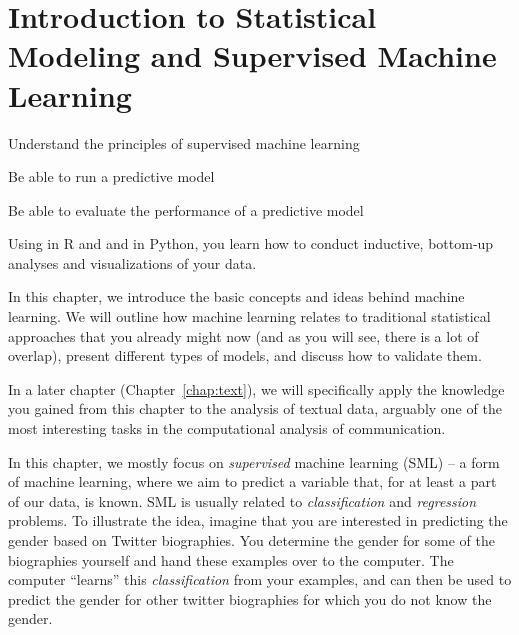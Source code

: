 \chapter{Introduction to Statistical Modeling and Supervised Machine Learning}
\label{chap:introsml}

\begin{abstract}{Abstract} This chapter introduces the reader to the world of supervised machine learning. It starts by outlining how classical statistical techniques such as regression models can be used for prediction. It then provides an overview of frequently-used techniques from Na\"ive Bayes classifiers to neural networks.
\end{abstract}



\begin{objectives}
\item Understand the principles of supervised machine learning
\item Be able to run a predictive model
\item Be able to evaluate the performance of a predictive model
\end{objectives}

\begin{feature}
Using  in R and  and  in Python, you learn how to conduct inductive, bottom-up analyses and visualizations of your data.
\end{feature}





In this chapter, we introduce the basic concepts and ideas behind
machine learning.  We will outline how machine learning relates to
traditional statistical approaches that you already might now (and as
you will see, there is a lot of overlap), present different types of
models, and discuss how to validate them.

In a later chapter (Chapter~\ref{chap:text}), we will 
specifically apply the knowledge you gained from this chapter to the
analysis of textual data, arguably one of the most interesting tasks
in the computational analysis of communication.

In this chapter, we mostly focus on \emph{supervised} machine learning (SML) 
-- a form of machine learning, where we aim to predict a variable
that, for at least a part of our data, is known. SML is usually related to \textit{classification} and \textit{regression}  problems. To illustrate the
idea, imagine that you are interested in predicting the gender based
on Twitter biographies. You determine the gender for some of the
biographies yourself and hand these examples over to the computer. The
computer ``learns'' this \textit{classification} from your examples, and can then be used to predict the gender for other twitter biographies for which you do not
know the gender.


